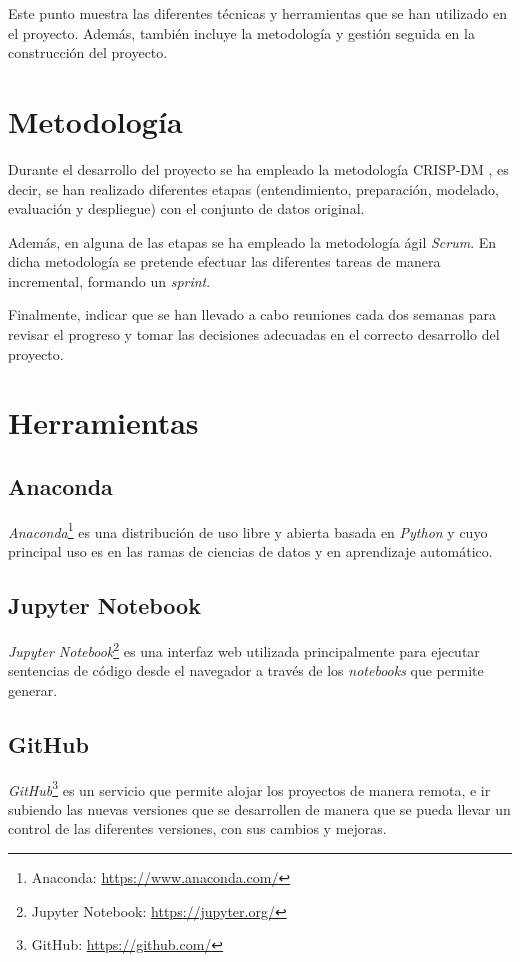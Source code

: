 
Este punto muestra las diferentes técnicas  y herramientas que se han utilizado en el proyecto. Además, también incluye la metodología y gestión seguida en la construcción del proyecto.

\section{Metodología}
Durante el desarrollo del proyecto se ha empleado la metodología CRISP-DM \cite{Haya_2022}, es decir, se han realizado diferentes etapas (entendimiento, preparación, modelado, evaluación y despliegue) con el conjunto de datos original.

Además, en alguna de las etapas se ha empleado la metodología ágil \emph{Scrum}. En dicha metodología \cite{Proyectos_Ágiles_2021} se pretende efectuar las diferentes tareas de manera incremental, formando un \emph{sprint}. 

Finalmente, indicar que se han llevado a cabo reuniones cada dos semanas para revisar el progreso y tomar las decisiones adecuadas en el correcto desarrollo del proyecto.

\section{Herramientas}
\subsection{Anaconda}
\emph{Anaconda}\footnote{Anaconda: \url{https://www.anaconda.com/}} es una distribución de uso libre y abierta basada en \emph{Python} y cuyo principal uso es en las ramas de ciencias de datos y en aprendizaje automático.

\subsection{Jupyter Notebook}
\emph{Jupyter Notebook}\footnote{Jupyter Notebook: \url{https://jupyter.org/}} es una interfaz web utilizada principalmente para ejecutar sentencias de código desde el navegador a través de los \emph{notebooks} que permite generar.

\subsection{GitHub}
\emph{GitHub}\footnote{GitHub: \url{https://github.com/}} es un servicio que permite alojar los proyectos de manera remota, e ir subiendo las nuevas versiones que se desarrollen de manera que se pueda llevar un control de las diferentes versiones, con sus cambios y mejoras.


